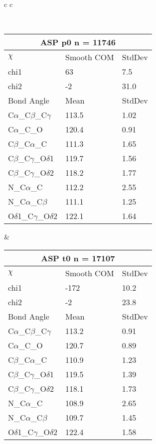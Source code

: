 \begin{longtable}{ c c }

\caption{ASP Central Values}\\
  \begin{tabular}{ l l l }
  \toprule
  \multicolumn{3}{c}{ASP \textbf{p0} n = 11746} \\ \toprule
  $\chi$       & Smooth COM & StdDev \\ \midrule
  chi1 & 63 & 7.5 \\ 
  chi2 & -2 & 31.0 \\ \midrule
  Bond Angle   & Mean     & StdDev \\ \midrule
  C$\alpha$\_C$\beta$\_C$\gamma$ & 113.5 & 1.02\\
  C$\alpha$\_C\_O & 120.4 & 0.91\\
  C$\beta$\_C$\alpha$\_C & 111.3 & 1.65\\
  C$\beta$\_C$\gamma$\_O$\delta$1 & 119.7 & 1.56\\
  C$\beta$\_C$\gamma$\_O$\delta$2 & 118.2 & 1.77\\
  N\_C$\alpha$\_C & 112.2 & 2.55\\
  N\_C$\alpha$\_C$\beta$ & 111.1 & 1.25\\
  O$\delta$1\_C$\gamma$\_O$\delta$2 & 122.1 & 1.64\\
  \bottomrule
  \end{tabular}
  &
  \begin{tabular}{ l l l }
  \toprule
  \multicolumn{3}{c}{ASP \textbf{t0} n = 17107} \\ \toprule
  $\chi$       & Smooth COM & StdDev \\ \midrule
  chi1 & -172 & 10.2 \\ 
  chi2 & -2 & 23.8 \\ \midrule
  Bond Angle   & Mean     & StdDev \\ \midrule
  C$\alpha$\_C$\beta$\_C$\gamma$ & 113.2 & 0.91\\
  C$\alpha$\_C\_O & 120.7 & 0.89\\
  C$\beta$\_C$\alpha$\_C & 110.9 & 1.23\\
  C$\beta$\_C$\gamma$\_O$\delta$1 & 119.5 & 1.39\\
  C$\beta$\_C$\gamma$\_O$\delta$2 & 118.1 & 1.73\\
  N\_C$\alpha$\_C & 108.9 & 2.65\\
  N\_C$\alpha$\_C$\beta$ & 109.7 & 1.45\\
  O$\delta$1\_C$\gamma$\_O$\delta$2 & 122.4 & 1.58\\
  \bottomrule

\end{tabular}
\end{longtable}
